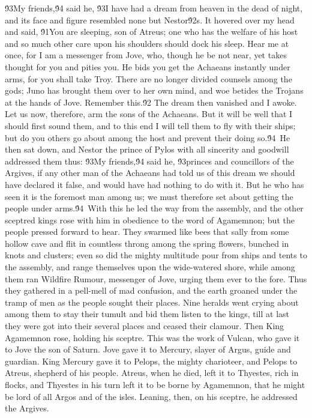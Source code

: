 {\'93My friends,\'94 said he, \'93I have had a dream from heaven in the dead of night, and its face and figure resembled none but Nestor\'92s. It hovered over my head and said, \'91You are sleeping, son of Atreus; one who has the welfare of his host and so much other care upon his shoulders should dock his sleep. Hear me at once, for I am a messenger from Jove, who, though he be not near, yet takes thought for you and pities you. He bids you get the Achaeans instantly under arms, for you shall take Troy. There are no longer divided counsels among the gods; Juno has brought them over to her own mind, and woe betides the Trojans at the hands of Jove. Remember this.\'92 The dream then vanished and I awoke. Let us now, therefore, arm the sons of the Achaeans. But it will be well that I should first sound them, and to this end I will tell them to fly with their ships; but do you others go about among the host and prevent their doing so.\'94\
He then sat down, and Nestor the prince of Pylos with all sincerity and goodwill addressed them thus: \'93My friends,\'94 said he, \'93princes and councillors of the Argives, if any other man of the Achaeans had told us of this dream we should have declared it false, and would have had nothing to do with it. But he who has seen it is the foremost man among us; we must therefore set about getting the people under arms.\'94\
With this he led the way from the assembly, and the other sceptred kings rose with him in obedience to the word of Agamemnon; but the people pressed forward to hear. They swarmed like bees that sally from some hollow cave and flit in countless throng among the spring flowers, bunched in knots and clusters; even so did the mighty multitude pour from ships and tents to the assembly, and range themselves upon the wide-watered shore, while among them ran Wildfire Rumour, messenger of Jove, urging them ever to the fore. Thus they gathered in a pell-mell of mad confusion, and the earth groaned under the tramp of men as the people sought their places. Nine heralds went crying about among them to stay their tumult and bid them listen to the kings, till at last they were got into their several places and ceased their clamour. Then King Agamemnon rose, holding his sceptre. This was the work of Vulcan, who gave it to Jove the son of Saturn. Jove gave it to Mercury, slayer of Argus, guide and guardian. King Mercury gave it to Pelops, the mighty charioteer, and Pelops to Atreus, shepherd of his people. Atreus, when he died, left it to Thyestes, rich in flocks, and Thyestes in his turn left it to be borne by Agamemnon, that he might be lord of all Argos and of the isles. Leaning, then, on his sceptre, he addressed the Argives.\
}
